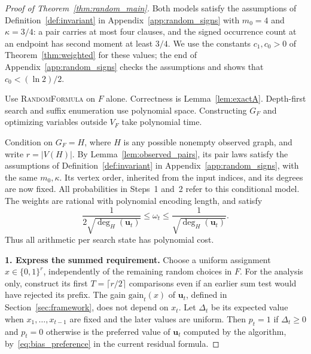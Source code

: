 \documentclass[11pt,a4paper]{article}
\theoremstyle{definition}
\theoremstyle{remark}
\newcommand{\bits}{\{0,1\}}
\begin{document}
\begin{proof}[Proof of Theorem~\ref{thm:random_main}]
Both models satisfy the assumptions of Definition~\ref{def:invariant}
in Appendix~\ref{app:random_signs} with $m_0=4$ and $\kappa=3/4$: a pair
carries at most four clauses, and the signed occurrence count at an
endpoint has second moment at least $3/4$. We use the constants
$c_1,c_0>0$ of Theorem~\ref{thm:weighted} for these values;
the end of Appendix~\ref{app:random_signs} checks the assumptions and
shows that $c_0<(\ln2)/2$.

Use \textnormal{\textsc{RandomFormula}} on $F$ alone.
Correctness is Lemma~\ref{lem:exactA}. Depth-first
search and suffix enumeration use polynomial space. Constructing $G_F$
and optimizing variables outside $V_F$ take polynomial time.

Condition on $G_F=H$, where $H$ is any possible nonempty observed graph,
and write $r=|V(H)|$. By Lemma~\ref{lem:observed_pairs}, its pair laws
satisfy the assumptions of Definition~\ref{def:invariant} in Appendix~\ref{app:random_signs},
with the same $m_0,\kappa$. Its vertex order, inherited from the input indices, and its
degrees are now fixed. All probabilities in Steps~1 and~2 refer to this
conditional model. The weights are rational with polynomial encoding
length, and satisfy
\begin{equation}
 \frac{1}{2\sqrt{\deg_H(\mathbf u_t)}}\le\omega_t
 \le\frac{1}{\sqrt{\deg_H(\mathbf u_t)}}.
 \label{eq:random_weight_bounds}
\end{equation}
Thus all arithmetic per search state has polynomial cost.

\par\medskip\noindent\textbf{1. Express the summed requirement.}
Choose a uniform assignment $x\in\bits^r$, independently of the remaining
random choices in $F$. For the analysis only, construct its first $T=\lceil r/2\rceil$
comparisons even if an earlier sum test would have rejected its prefix.
The gain $\mathrm{gain}_t(x)$ of $\mathbf u_t$, defined in
Section~\ref{sec:framework}, does not depend on $x_t$. Let $\Delta_t$ be its
expected value when $x_1,\ldots,x_{t-1}$ are fixed and the later values are
uniform. Then $p_t=1$ if $\Delta_t\ge0$ and $p_t=0$ otherwise is the
preferred value of $\mathbf u_t$ computed by the algorithm,
by~\eqref{eq:bias_preference} in the current residual formula.


\end{proof}
\end{document}
